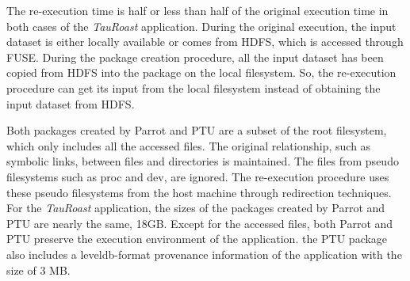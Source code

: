 The re-execution time is half or less than half of the original execution time in both cases of the \emph{TauRoast} application. During the original execution, the input dataset is either locally available or comes from HDFS, which is accessed through FUSE. During the package creation procedure, all the input dataset has been copied from HDFS into the package on the local filesystem. So, the re-execution procedure can get its input from the local filesystem instead of obtaining the input dataset from HDFS.

Both packages created by Parrot and PTU are a subset of the root filesystem, which only includes all the accessed files. The original relationship, such as symbolic links, between files and directories is maintained. The files from pseudo filesystems such as proc and dev, are ignored. The re-execution procedure uses these pseudo filesystems from the host machine through redirection techniques.
For the \emph{TauRoast} application, the sizes of the packages created by Parrot and PTU are nearly the same, 18GB. 
Except for the accessed files, both Parrot and PTU preserve the execution environment of the application. 
the PTU package also includes a leveldb-format provenance information of the application with the size of 3 MB.

